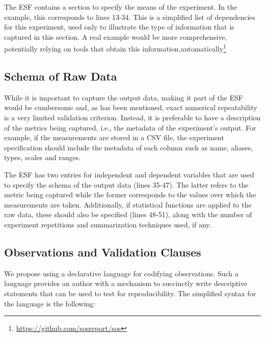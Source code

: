 \documentclass[10pt,reprint]{sigplanconf}
\renewcommand{\href}[2]{#2\footnote{\url{#1}}}
\begin{document}
The ESF contains a section to specify the means of the experiment. In
the example, this corresponds to lines 13-34. This is a simplified list
of dependencies for this experiment, used only to illustrate the type of
information that is captured in this section. A real example would be
more comprehensive, potentially relying on tools that obtain this
information.\href{https://github.com/sosreport/sos}{automatically}

\subsection{Schema of Raw Data}\label{sec:schema}

While it is important to capture the output data, making it part of the
ESF would be cumbersome and, as has been mentioned, exact numerical
repeatability is a very limited validation criterion. Instead, it is
preferable to have a description of the metrics being captured, i.e.,
the metadata of the experiment's output. For example, if the
measurements are stored in a CSV file, the experiment specification
should include the metadata of each column such as name, aliases, types,
scales and ranges.

The ESF has two entries for independent and dependent variables that are
used to specify the schema of the output data (lines 35-47). The latter
refers to the metric being captured while the former corresponds to the
values over which the measurements are taken. Additionally, if
statistical functions are applied to the raw data, these should also be
specified (lines 48-51), along with the number of experiment repetitions
and summarization techniques used, if any.

\subsection{Observations and Validation Clauses}\label{sec:validation}

We propose using a declarative language for codifying observations. Such
a language provides an author with a mechanism to succinctly write
descriptive statements that can be used to test for reproducibility. The
simplified syntax for the language is the following:
\end{document}
